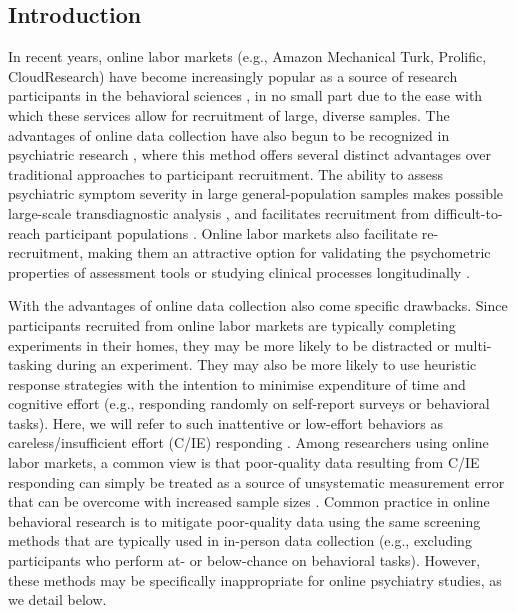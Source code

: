 \documentclass[a4paper,notitlepage,12pt]{article}
\begin{document}
\begin{refsection}[main]
\section*{Introduction}

In recent years, online labor markets (e.g., Amazon Mechanical Turk, Prolific, CloudResearch) have become increasingly popular as a source of research participants in the behavioral sciences \cite{stewart2017crowdsourcing}, in no small part due to the ease with which these services allow for recruitment of large, diverse samples. The advantages of online data collection have also begun to be recognized in psychiatric research \cite{chandler2016conducting}, where this method offers several distinct advantages over traditional approaches to participant recruitment. The ability to assess psychiatric symptom severity in large general-population samples makes possible large-scale transdiagnostic analysis \cite{gillan2016taking, rutledge2019machine}, and facilitates recruitment from difficult-to-reach participant populations \cite{strickland2019use}. Online labor markets also facilitate re-recruitment, making them an attractive option for validating the psychometric properties of assessment tools \cite{enkavi2019large} or studying clinical processes longitudinally \cite{kothe2019retention}.

With the advantages of online data collection also come specific drawbacks. Since participants recruited from online labor markets are typically completing experiments in their homes, they may be more likely to be distracted or multi-tasking during an experiment. They may also be more likely to use heuristic response strategies with the intention to minimise expenditure of time and cognitive effort (e.g., responding randomly on self-report surveys or behavioral tasks). Here, we will refer to such inattentive or low-effort behaviors as careless/insufficient effort (C/IE) responding \cite{huang2012detecting, curran2016methods}. Among researchers using online labor markets, a common view is that poor-quality data resulting from C/IE responding can simply be treated as a source of unsystematic measurement error that can be overcome with increased sample sizes \cite{gillan2016taking, chandler2020participant}. Common practice in online behavioral research is to mitigate poor-quality data using the same screening methods that are typically used in in-person data collection (e.g., excluding participants who perform at- or below-chance on behavioral tasks). However, these methods may be specifically inappropriate for online psychiatry studies, as we detail below.


\end{refsection}
\end{document}
